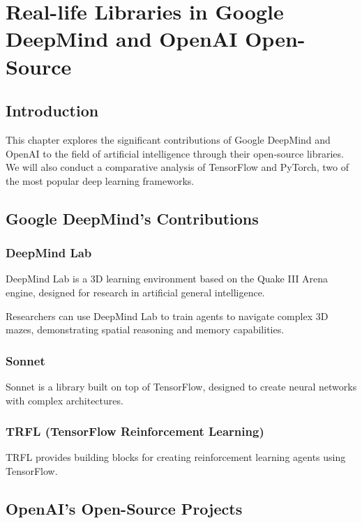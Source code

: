 \documentclass[
]{article}
\author{}
\date{}
\begin{document}
\chapter{Real-life Libraries in Google DeepMind and OpenAI Open-Source}

\section{Introduction}

This chapter explores the significant contributions of Google DeepMind
and OpenAI to the field of artificial intelligence through their
open-source libraries. We will also conduct a comparative analysis of
TensorFlow and PyTorch, two of the most popular deep learning
frameworks.

\section{Google DeepMind's Contributions}

\subsection{DeepMind Lab}

DeepMind Lab is a 3D learning environment based on the Quake III Arena
engine, designed for research in artificial general intelligence.

\begin{example}
Researchers can use DeepMind Lab to train agents to navigate complex 3D mazes, demonstrating spatial reasoning and memory capabilities.
\end{example}

\subsection{Sonnet}

Sonnet is a library built on top of TensorFlow, designed to create
neural networks with complex architectures.

\subsection{TRFL (TensorFlow Reinforcement Learning)}

TRFL provides building blocks for creating reinforcement learning agents
using TensorFlow.

\section{OpenAI's Open-Source Projects}
\end{document}
